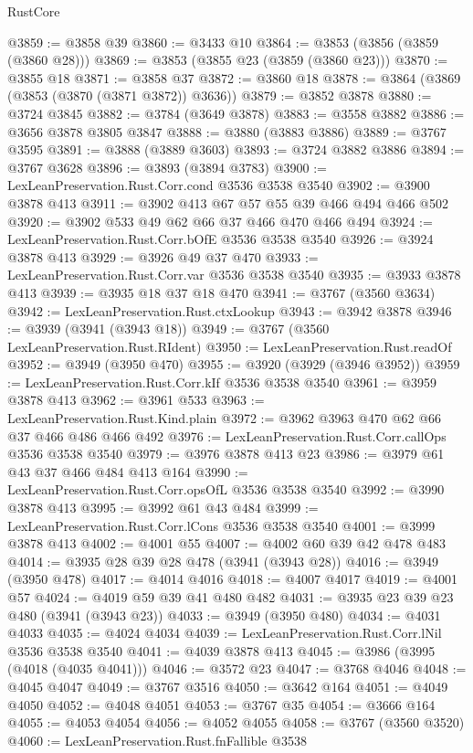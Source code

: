 \begin{lexlean}{RustCore}
\begin{coremodule}
@3859 := @3858 @39
@3860 := @3433 @10
@3864 := @3853 (@3856 (@3859 (@3860 @28)))
@3869 := @3853 (@3855 @23 (@3859 (@3860 @23)))
@3870 := @3855 @18
@3871 := @3858 @37
@3872 := @3860 @18
@3878 := @3864 (@3869 (@3853 (@3870 (@3871 @3872)) @3636))
@3879 := @3852 @3878
@3880 := @3724 @3845
@3882 := @3784 (@3649 @3878)
@3883 := @3558 @3882
@3886 := @3656 @3878 @3805 @3847
@3888 := @3880 (@3883 @3886)
@3889 := @3767 @3595
@3891 := @3888 (@3889 @3603)
@3893 := @3724 @3882 @3886
@3894 := @3767 @3628
@3896 := @3893 (@3894 @3783)
@3900 := LexLeanPreservation.Rust.Corr.cond @3536 @3538 @3540
@3902 := @3900 @3878 @413
@3911 := @3902 @413 @67 @57 @55 @39 @466 @494 @466 @502
@3920 := @3902 @533 @49 @62 @66 @37 @466 @470 @466 @494
@3924 := LexLeanPreservation.Rust.Corr.bOfE @3536 @3538 @3540
@3926 := @3924 @3878 @413
@3929 := @3926 @49 @37 @470
@3933 := LexLeanPreservation.Rust.Corr.var @3536 @3538 @3540
@3935 := @3933 @3878 @413
@3939 := @3935 @18 @37 @18 @470
@3941 := @3767 (@3560 @3634)
@3942 := LexLeanPreservation.Rust.ctxLookup
@3943 := @3942 @3878
@3946 := @3939 (@3941 (@3943 @18))
@3949 := @3767 (@3560 LexLeanPreservation.Rust.RIdent)
@3950 := LexLeanPreservation.Rust.readOf
@3952 := @3949 (@3950 @470)
@3955 := @3920 (@3929 (@3946 @3952))
@3959 := LexLeanPreservation.Rust.Corr.kIf @3536 @3538 @3540
@3961 := @3959 @3878 @413
@3962 := @3961 @533
@3963 := LexLeanPreservation.Rust.Kind.plain
@3972 := @3962 @3963 @470 @62 @66 @37 @466 @486 @466 @492
@3976 := LexLeanPreservation.Rust.Corr.callOps @3536 @3538 @3540
@3979 := @3976 @3878 @413 @23
@3986 := @3979 @61 @43 @37 @466 @484 @413 @164
@3990 := LexLeanPreservation.Rust.Corr.opsOfL @3536 @3538 @3540
@3992 := @3990 @3878 @413
@3995 := @3992 @61 @43 @484
@3999 := LexLeanPreservation.Rust.Corr.lCons @3536 @3538 @3540
@4001 := @3999 @3878 @413
@4002 := @4001 @55
@4007 := @4002 @60 @39 @42 @478 @483
@4014 := @3935 @28 @39 @28 @478 (@3941 (@3943 @28))
@4016 := @3949 (@3950 @478)
@4017 := @4014 @4016
@4018 := @4007 @4017
@4019 := @4001 @57
@4024 := @4019 @59 @39 @41 @480 @482
@4031 := @3935 @23 @39 @23 @480 (@3941 (@3943 @23))
@4033 := @3949 (@3950 @480)
@4034 := @4031 @4033
@4035 := @4024 @4034
@4039 := LexLeanPreservation.Rust.Corr.lNil @3536 @3538 @3540
@4041 := @4039 @3878 @413
@4045 := @3986 (@3995 (@4018 (@4035 @4041)))
@4046 := @3572 @23
@4047 := @3768 @4046
@4048 := @4045 @4047
@4049 := @3767 @3516
@4050 := @3642 @164
@4051 := @4049 @4050
@4052 := @4048 @4051
@4053 := @3767 @35
@4054 := @3666 @164
@4055 := @4053 @4054
@4056 := @4052 @4055
@4058 := @3767 (@3560 @3520)
@4060 := LexLeanPreservation.Rust.fnFallible @3538

\end{coremodule}
\end{lexlean}
